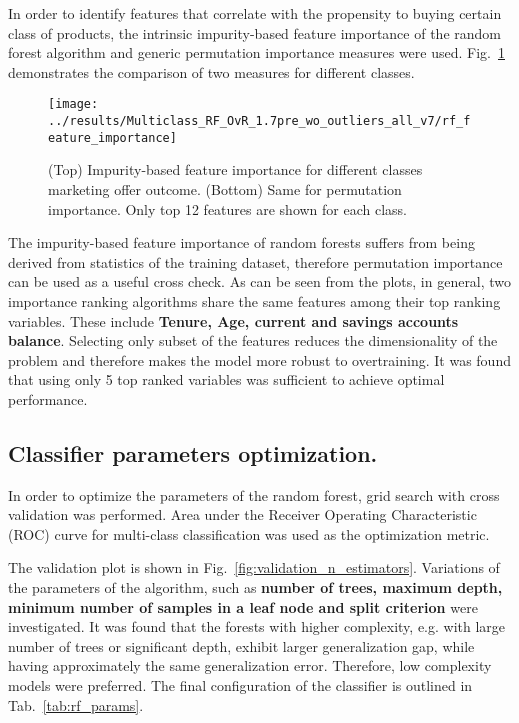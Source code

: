 \documentclass[14pt]{scrartcl}
\begin{document}
In order to identify features that correlate with the propensity to buying certain
class of products, the intrinsic impurity-based feature importance of the
random forest algorithm and generic permutation importance measures were used. 
Fig.~\ref{fig:feature_importance} demonstrates the comparison
of two measures for different classes.
\begin{figure}[htpb!]
    \centering
    \texttt{[image: ../results/Multiclass\_RF\_OvR\_1.7pre\_wo\_outliers\_all\_v7/rf\_feature\_importance]}\\
    \caption{ (Top) Impurity-based feature importance for different classes marketing 
    offer outcome. (Bottom) Same for permutation importance. Only top 12 features are
    shown for each class.}
    \label{fig:feature_importance}
 \end{figure}
The impurity-based feature importance of random forests suffers from being derived 
from statistics of the training dataset, therefore permutation importance
can be used as a useful cross check. As can be seen from the plots, in general, two
importance ranking algorithms share the same features among their top ranking
variables. These include \textbf{Tenure, Age, current and savings accounts balance}. 
Selecting only subset of the features reduces the dimensionality of the problem and
therefore makes the model more robust to overtraining. It was found that using only 
5 top ranked variables was sufficient to achieve optimal performance.

\subsection{Classifier parameters optimization.}

In order to optimize the parameters of the random forest, grid search with cross validation
was performed. Area under the Receiver Operating Characteristic (ROC) curve for 
multi-class classification was used as the optimization metric. 

The validation plot is shown in Fig.~\ref{fig:validation_n_estimators}. Variations of the 
parameters of the algorithm, such as \textbf{number of trees, maximum depth, minimum
number of samples in a leaf node and split criterion} were investigated. It was found
that the forests with higher complexity, e.g. with large number of trees or significant depth,
exhibit larger generalization gap, while having approximately the same generalization
error. Therefore, low complexity models were preferred.
The final configuration of the classifier is outlined in Tab.~\ref{tab:rf_params}.
\end{document}
